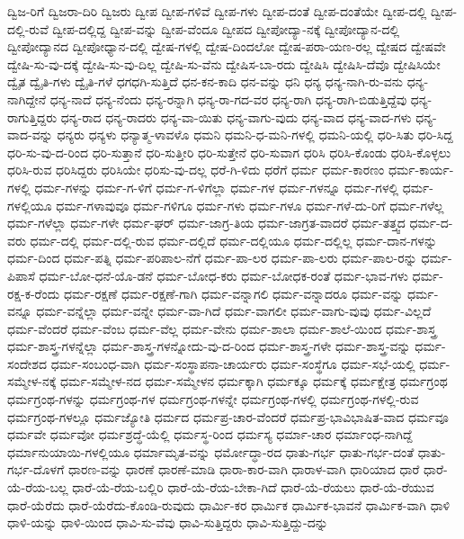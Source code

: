 {ದ್ವಿಜ-ರಿಗೆ
ದ್ವಿಜರಾ-ದಿರಿ
ದ್ವಿಜರು
ದ್ವೀಪ
ದ್ವೀಪ-ಗಳಿವೆ
ದ್ವೀಪ-ಗಳು
ದ್ವೀಪ-ದಂತೆ
ದ್ವೀಪ-ದಂತೆಯೇ
ದ್ವೀಪ-ದಲ್ಲಿ
ದ್ವೀಪ-ದಲ್ಲಿ-ರುವೆ
ದ್ವೀಪ-ದಲ್ಲಿದ್ದ
ದ್ವೀಪ-ವನ್ನು
ದ್ವೀಪ-ವೆಂದೂ
ದ್ವೀಪದ
ದ್ವೀಪೋದ್ಯಾ-ನಕ್ಕೆ
ದ್ವೀಪೋದ್ಯಾನ-ದಲ್ಲಿ
ದ್ವೀಪೋದ್ಯಾನದ
ದ್ವೀಪೋಧ್ಯಾನ-ದಲ್ಲಿ
ದ್ವೇಷ-ಗಳಲ್ಲಿ
ದ್ವೇಷ-ದಿಂದಲೋ
ದ್ವೇಷ-ಪರಾ-ಯಣ-ರಲ್ಲ
ದ್ವೇಷದ
ದ್ವೇಷವೇ
ದ್ವೇಷಿ-ಸು-ವು-ದಕ್ಕೆ
ದ್ವೇಷಿ-ಸು-ವು-ದಿಲ್ಲ
ದ್ವೇಷಿ-ಸು-ವೆನು
ದ್ವೇಷಿಸ-ಬಾ-ರದು
ದ್ವೇಷಿಸಿ
ದ್ವೇಷಿಸಿ-ದೆವೊ
ದ್ವೇಷಿಸಿಯೇ
ದ್ವೈತ
ದ್ವೈತಿ-ಗಳು
ದ್ವೈತಿ-ಗಳೆ
ಧಗಧಗಿ-ಸುತ್ತಿದೆ
ಧನ-ಕನ-ಕಾದಿ
ಧನ-ವನ್ನು
ಧನಿ
ಧನ್ಯ
ಧನ್ಯ-ನಾಗಿ-ರು-ವನು
ಧನ್ಯ-ನಾಗಿದ್ದೇನೆ
ಧನ್ಯ-ನಾದೆ
ಧನ್ಯ-ನೆಂದು
ಧನ್ಯ-ರನ್ನಾಗಿ
ಧನ್ಯ-ರಾ-ಗದ-ವರ
ಧನ್ಯ-ರಾಗಿ
ಧನ್ಯ-ರಾಗಿ-ಬಿಡುತ್ತಿದ್ದೆವು
ಧನ್ಯ-ರಾಗುತ್ತಿದ್ದರು
ಧನ್ಯ-ರಾದ
ಧನ್ಯ-ರಾದರು
ಧನ್ಯ-ವಾ-ಯಿತು
ಧನ್ಯ-ವಾಗು-ವುದು
ಧನ್ಯ-ವಾದ
ಧನ್ಯ-ವಾದ-ಗಳು
ಧನ್ಯ-ವಾದ-ವನ್ನು
ಧನ್ಯರು
ಧನ್ಯಳು
ಧನ್ಯಾತ್ಮ-ಳಾವಳೊ
ಧಮನಿ
ಧಮನಿ-ಧ-ಮನಿ-ಗಳಲ್ಲಿ
ಧಮನಿ-ಯಲ್ಲಿ
ಧರಿ-ಸಿತು
ಧರಿ-ಸಿದ್ದ
ಧರಿ-ಸು-ವು-ದ-ರಿಂದ
ಧರಿ-ಸುತ್ತಾನೆ
ಧರಿ-ಸುತ್ತೀರಿ
ಧರಿ-ಸುತ್ತೇನೆ
ಧರಿ-ಸುವಾಗ
ಧರಿಸಿ
ಧರಿಸಿ-ಕೊಂಡು
ಧರಿಸಿ-ಕೊಳ್ಳಲು
ಧರಿಸಿ-ರುವ
ಧರಿಸಿದ್ದರು
ಧರಿಸಿಯೇ
ಧರಿಸು-ವು-ದಲ್ಲ
ಧರೆ-ಗಿ-ಳಿದು
ಧರೆಗೆ
ಧರ್ಮ
ಧರ್ಮ-ಕಾರಣಂ
ಧರ್ಮ-ಕಾರ್ಯ-ಗಳಲ್ಲಿ
ಧರ್ಮ-ಗಳನ್ನು
ಧರ್ಮ-ಗ-ಳಿಗೆ
ಧರ್ಮ-ಗ-ಳಿಗೆಲ್ಲಾ
ಧರ್ಮ-ಗಳ
ಧರ್ಮ-ಗಳನ್ನೂ
ಧರ್ಮ-ಗಳಲ್ಲಿ
ಧರ್ಮ-ಗಳಲ್ಲಿಯೂ
ಧರ್ಮ-ಗಳಾವುವೂ
ಧರ್ಮ-ಗಳಿಗೂ
ಧರ್ಮ-ಗಳು
ಧರ್ಮ-ಗಳೂ
ಧರ್ಮ-ಗಳೆ-ದು-ರಿಗೆ
ಧರ್ಮ-ಗಳೆಲ್ಲ
ಧರ್ಮ-ಗಳೆಲ್ಲಾ
ಧರ್ಮ-ಗಳೇ
ಧರ್ಮ-ಘರ್
ಧರ್ಮ-ಜಾಗ್ರ-ತಿಯ
ಧರ್ಮ-ಜಾಗ್ರತ-ವಾದರೆ
ಧರ್ಮ-ತತ್ತ್ವದ
ಧರ್ಮ-ದ-ವರು
ಧರ್ಮ-ದಲ್ಲಿ
ಧರ್ಮ-ದಲ್ಲಿ-ರುವ
ಧರ್ಮ-ದಲ್ಲಿದೆ
ಧರ್ಮ-ದಲ್ಲಿಯೂ
ಧರ್ಮ-ದಲ್ಲಿಲ್ಲ
ಧರ್ಮ-ದಾನ-ಗಳನ್ನು
ಧರ್ಮ-ದಿಂದ
ಧರ್ಮ-ಪತ್ನಿ
ಧರ್ಮ-ಪರಿಪಾಲ-ನೆಗೆ
ಧರ್ಮ-ಪಾ-ಲರ
ಧರ್ಮ-ಪಾ-ಲರು
ಧರ್ಮ-ಪಾಲ-ರನ್ನು
ಧರ್ಮ-ಪಿಪಾಸೆ
ಧರ್ಮ-ಬೋ-ಧನೆ-ಯೊ-ಡನೆ
ಧರ್ಮ-ಬೋಧ-ಕರು
ಧರ್ಮ-ಬೋಧಕ-ರಂತೆ
ಧರ್ಮ-ಭಾವ-ಗಳು
ಧರ್ಮ-ರಕ್ಷ-ಕ-ರೆಂದು
ಧರ್ಮ-ರಕ್ಷಣೆ
ಧರ್ಮ-ರಕ್ಷಣೆ-ಗಾಗಿ
ಧರ್ಮ-ವನ್ನಾಗಲಿ
ಧರ್ಮ-ವನ್ನಾದರೂ
ಧರ್ಮ-ವನ್ನು
ಧರ್ಮ-ವನ್ನೂ
ಧರ್ಮ-ವನ್ನೆಲ್ಲಾ
ಧರ್ಮ-ವನ್ನೇ
ಧರ್ಮ-ವಾ-ಗಿದೆ
ಧರ್ಮ-ವಾಗಲೀ
ಧರ್ಮ-ವಾಗು-ವುವು
ಧರ್ಮ-ವಿಲ್ಲದೆ
ಧರ್ಮ-ವೆಂದರೆ
ಧರ್ಮ-ವೆಂಬ
ಧರ್ಮ-ವೆಲ್ಲ
ಧರ್ಮ-ವೇನು
ಧರ್ಮ-ಶಾಲಾ
ಧರ್ಮ-ಶಾಲೆ-ಯಿಂದ
ಧರ್ಮ-ಶಾಸ್ತ್ರ
ಧರ್ಮ-ಶಾಸ್ತ್ರ-ಗಳನ್ನೆಲ್ಲಾ
ಧರ್ಮ-ಶಾಸ್ತ್ರ-ಗಳನ್ನೋದು-ವು-ದ-ರಿಂದ
ಧರ್ಮ-ಶಾಸ್ತ್ರ-ಗಳೇ
ಧರ್ಮ-ಶಾಸ್ತ್ರ-ವನ್ನು
ಧರ್ಮ-ಸಂದೇಶದ
ಧರ್ಮ-ಸಂಬಂಧ-ವಾಗಿ
ಧರ್ಮ-ಸಂಸ್ಥಾಪನಾ-ಚಾರ್ಯರು
ಧರ್ಮ-ಸಂಸ್ಥೆಗೂ
ಧರ್ಮ-ಸಭೆ-ಯಲ್ಲಿ
ಧರ್ಮ-ಸಮ್ಮೇಳ-ನಕ್ಕೆ
ಧರ್ಮ-ಸಮ್ಮೇಳ-ನದ
ಧರ್ಮ-ಸಮ್ಮೇಳನ
ಧರ್ಮಕ್ಕಾಗಿ
ಧರ್ಮಕ್ಕೂ
ಧರ್ಮಕ್ಕೆ
ಧರ್ಮಕ್ಷೇತ್ರ
ಧರ್ಮಗ್ರಂಥ
ಧರ್ಮಗ್ರಂಥ-ಗಳನ್ನು
ಧರ್ಮಗ್ರಂಥ-ಗಳ
ಧರ್ಮಗ್ರಂಥ-ಗಳನ್ನೇ
ಧರ್ಮಗ್ರಂಥ-ಗಳಲ್ಲಿ
ಧರ್ಮಗ್ರಂಥ-ಗಳಲ್ಲಿ-ರುವ
ಧರ್ಮಗ್ರಂಥ-ಗಳಲ್ಲೂ
ಧರ್ಮಜ್ಯೋತಿ
ಧರ್ಮದ
ಧರ್ಮಪ್ರ-ಚಾರ-ವೆಂದರೆ
ಧರ್ಮಪ್ರ-ಭಾವಿಭಾಷಿತ-ವಾದ
ಧರ್ಮವೂ
ಧರ್ಮವೇ
ಧರ್ಮವೋ
ಧರ್ಮಶ್ರದ್ಧೆ-ಯೆಲ್ಲಿ
ಧರ್ಮಸ್ಥ-ರಿಂದ
ಧರ್ಮಸ್ಯ
ಧರ್ಮಾ-ಚಾರ
ಧರ್ಮಾಂಧ-ನಾಗಿದ್ದೆ
ಧರ್ಮಾನುಯಾಯಿ-ಗಳಲ್ಲಿಯೂ
ಧರ್ಮಾಮೃತ-ವನ್ನು
ಧರ್ಮೋದ್ಧಾ-ರದ
ಧಾತು-ಗರ್ಭ
ಧಾತು-ಗರ್ಭ-ದಂತೆ
ಧಾತು-ಗರ್ಭ-ದೊಳಗೆ
ಧಾರಣ-ವನ್ನು
ಧಾರಣೆ
ಧಾರಣೆ-ಮಾಡಿ
ಧಾರಾ-ಕಾರ-ವಾಗಿ
ಧಾರಾಳ-ವಾಗಿ
ಧಾರಿಯಾದ
ಧಾರೆ
ಧಾರೆ-ಯೆ-ರೆಯ-ಬಲ್ಲ
ಧಾರೆ-ಯೆ-ರೆಯ-ಬಲ್ಲಿರಿ
ಧಾರೆ-ಯೆ-ರೆಯ-ಬೇಕಾ-ಗಿದೆ
ಧಾರೆ-ಯೆ-ರೆಯಲು
ಧಾರೆ-ಯೆ-ರೆಯುವ
ಧಾರೆ-ಯೆರೆದು
ಧಾರೆ-ಯೆರೆದು-ಕೊಂಡಿ-ರುವುದು
ಧಾರ್ಮಿ-ಕರ
ಧಾರ್ಮಿಕ
ಧಾರ್ಮಿಕ-ಭಾವನೆ
ಧಾರ್ಮಿಕ-ವಾಗಿ
ಧಾಳಿ
ಧಾಳಿ-ಯನ್ನು
ಧಾಳಿ-ಯಿಂದ
ಧಾವಿ-ಸು-ವೆವು
ಧಾವಿ-ಸುತ್ತಿದ್ದರು
ಧಾವಿ-ಸುತ್ತಿದ್ದು-ದನ್ನು
}
